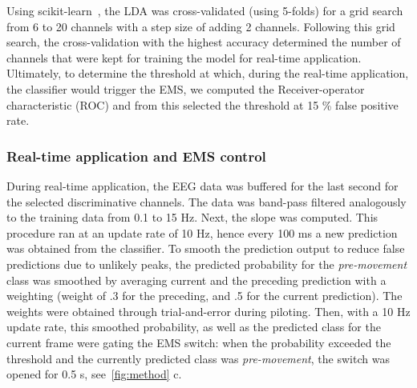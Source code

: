 Using scikit-learn~\cite{Pedregosa2012-sj}, the LDA was cross-validated (using 5-folds) for a grid search from 6 to 20 channels with a step size of adding 2 channels. Following this grid search, the cross-validation with the highest accuracy determined the number of channels that were kept for training the model for real-time application. Ultimately, to determine the threshold at which, during the real-time application, the classifier would trigger the EMS, we computed the Receiver-operator characteristic (ROC) and from this selected the threshold at 15 \% false positive rate.

\subsubsection{Real-time application and EMS control}
During real-time application, the EEG data was buffered for the last second for the selected discriminative channels. The data was band-pass filtered analogously to the training data from 0.1 to 15 Hz. Next, the slope was computed. This procedure ran at an update rate of 10 Hz, hence every 100 ms a new prediction was obtained from the classifier. To smooth the prediction output to reduce false predictions due to unlikely peaks, the predicted probability for the \textit{pre-movement} class was smoothed by averaging current and the preceding prediction with a weighting (weight of .3 for the preceding, and .5 for the current prediction). The weights were obtained through trial-and-error during piloting. Then, with a 10 Hz update rate, this smoothed probability, as well as the predicted class for the current frame were gating the EMS switch: when the probability exceeded the threshold and the currently predicted class was \textit{pre-movement}, the switch was opened for 0.5 s, see~\ref{fig:method} c.


